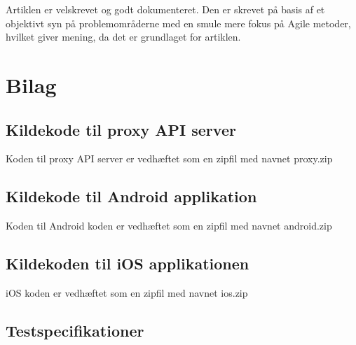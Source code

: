 \documentclass[12pt]{article}
\begin{document}
Artiklen er velskrevet og godt dokumenteret. Den er skrevet på basis af et objektivt syn på problemområderne med en smule mere fokus på Agile metoder, hvilket giver mening, da det er grundlaget for artiklen. 

\newpage

\section{Bilag}
\subsection{Kildekode til proxy API server}
Koden til proxy API server er vedhæftet som en zipfil med navnet proxy.zip
\subsection{Kildekode til Android applikation}
Koden til Android koden er vedhæftet som en zipfil med navnet android.zip
\subsection{Kildekoden til iOS applikationen}
iOS koden er vedhæftet som en zipfil med navnet ios.zip

\subsection{Testspecifikationer}
\label{testSpec}
\end{document}
